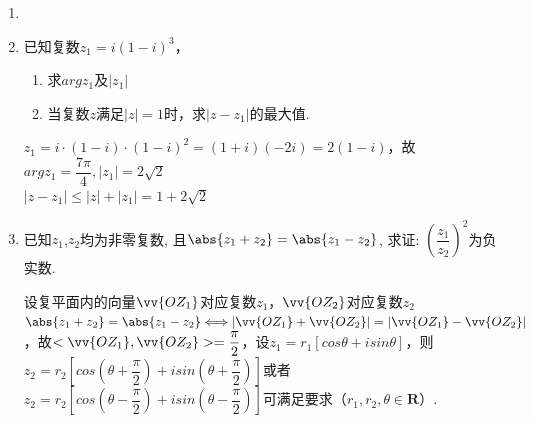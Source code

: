 \begin{enumerate}
\begin{enumerate}
\begin{jieda}
        $-1+\sqrt{3}i = 2(cos\dfrac{2\pi}{3} + i sin\dfrac{2\pi}{3})$，设$w = cos\dfrac{2\pi}{3} + i sin\dfrac{2\pi}{3}$ \\
        $z_1 = \sqrt[7]{2}(cos\dfrac{2\pi}{21} + i sin\dfrac{2\pi}{21})$，$z_2 = z_1 \cdot w = \sqrt[7]{2}(cos\dfrac{8\pi}{21} + i sin\dfrac{8\pi}{21}), z_3 = z_1 \cdot w^2 = \sqrt[7]{2}(cos\dfrac{14\pi}{21} + i sin\dfrac{14\pi}{21}), z_4 = z_1 \cdot w^3 = \sqrt[7]{2}(cos\dfrac{20\pi}{21} + i sin\dfrac{20\pi}{21}), z_5 = z_1 \cdot w^4 = \sqrt[7]{2}(cos\dfrac{26\pi}{21} + i sin\dfrac{26\pi}{21}), z_6 = z_1 \cdot w^5 = \sqrt[7]{2}(cos\dfrac{32\pi}{21} + i sin\dfrac{32\pi}{21}), z_7 = z_1 \cdot w^6 = \sqrt[7]{2}(cos\dfrac{38\pi}{21} + i sin\dfrac{38\pi}{21})$
    \end{jieda}
    \item {}
    \item 已知复数$z_1 = i(1-i)^3$，
    \begin{enumerate}
        \item 求$arg z_1$及$|z_1|$
        \item 当复数$z$满足$|z| = 1$时，求$|z - z_1|$的最大值.
    \end{enumerate}
    \begin{jieda}
        $z_1 = i \cdot (1-i) \cdot (1-i)^2 = (1+i)(-2i) = 2(1-i)$，故$arg z_1 = \dfrac{7\pi}{4}, |z_1| = 2\sqrt{2}$ \\
        $|z - z_1| \leq |z| + |z_1| = 1+2\sqrt{2}$
    \end{jieda}
    \item 已知$z_1$,$ z_2$均为非零复数, 且$\abs{z_1+z_2}=\abs{z_1-z_2}$, 求证: $\left(\dfrac{z_1}{z_2}\right)^2$为负实数. 
    \begin{jieda}
        设复平面内的向量$\vv{OZ_1}$对应复数$z_1$，$\vv{OZ_2}$对应复数$z_2$\\
        $\abs{z_1+z_2}=\abs{z_1-z_2} \Longleftrightarrow |\vv{OZ_1} + \vv{OZ_2}| = |\vv{OZ_1} - \vv{OZ_2}|$，故$<\vv{OZ_1}, \vv{OZ_2}> = \dfrac{\pi}{2}$，设$z_1 = r_1[cos\theta + i sin\theta]$，则$z_2 = r_2\left[cos\left(\theta+\dfrac{\pi}{2}\right) + i sin\left(\theta+\dfrac{\pi}{2}\right)\right]$或者$z_2 = r_2\left[cos\left(\theta-\dfrac{\pi}{2}\right) + i sin\left(\theta-\dfrac{\pi}{2}\right)\right]$可满足要求（$r_1, r_2, \theta \in \mathbf{R}$）.

\end{jieda}
\end{enumerate}
\end{enumerate}
